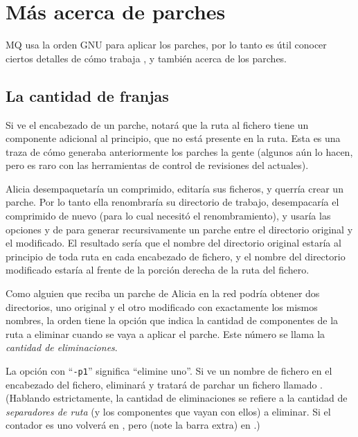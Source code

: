 \section{Más acerca de parches}
\label{sec:mq:adv-patch}

MQ usa la orden GNU  para aplicar los parches, por lo
tanto es útil conocer ciertos detalles de cómo trabaja
, y también acerca de los parches.

\subsection{La cantidad de franjas}

Si ve el encabezado de un parche, notará que la ruta al fichero tiene
un componente adicional al principio, que no está presente en la
ruta. Esta es una traza de cómo generaba anteriormente los parches la
gente (algunos aún lo hacen, pero es raro con las herramientas de
control de revisiones del actuales).

Alicia desempaquetaría un comprimido, editaría sus ficheros, y querría
crear un parche.  Por lo tanto ella renombraría su directorio de
trabajo, desempacaría el comprimido de nuevo (para lo cual necesitó el
renombramiento), y usaría las opciones  y
 de  para generar recursivamente un
parche entre el directorio original y el modificado.  El resultado
sería que el nombre del directorio original estaría al principio de
toda ruta en cada encabezado de fichero, y el nombre del directorio
modificado estaría al frente de la porción derecha de la ruta del
fichero.

Como alguien que reciba un parche de Alicia en la red podría obtener
dos directorios, uno original y el otro modificado con exactamente los
mismos nombres, la orden  tiene la opción
 que indica la cantidad de componentes de la ruta
a eliminar cuando se vaya a aplicar el parche.  Este número se
llama la \emph{cantidad de eliminaciones}.

La opción con ``\texttt{-p1}'' significa ``elimine uno''.  Si
 ve un nombre de fichero  en el
encabezado del fichero, eliminará  y tratará de parchar
un fichero llamado .  (Hablando estrictamente, la
cantidad de eliminaciones se refiere a la cantidad de \emph{separadores de
 ruta} (y los componentes que vayan con ellos) a eliminar.  Si el
contador es uno volverá  en , pero
 (note la barra extra) en .)

